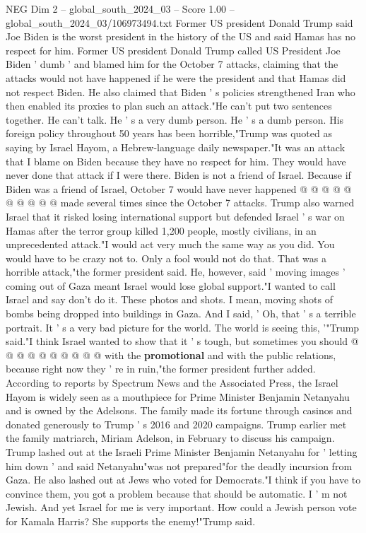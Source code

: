 \begin{textsample}{NEG Dim 2 – global\_south\_2024\_03 – Score 1.00 – global\_south\_2024\_03/106973494.txt}  \label{ex:f2_neg_433}
Former US president Donald Trump said Joe Biden is the worst president in the history of the US and said Hamas has no respect for him.
Former US president Donald Trump called US President Joe Biden ' dumb ' and blamed him for the October 7 attacks, claiming that the attacks would not have happened if he were the president and that Hamas did not respect Biden.
He also claimed that Biden ' s policies strengthened Iran who then enabled its proxies to plan such an attack."He can't put two sentences together.
He can't talk.
He ' s a very dumb person.
He ' s a dumb person.
His foreign policy throughout 50 years has been horrible,"Trump was quoted as saying by Israel Hayom, a Hebrew-language daily newspaper."It was an attack that I blame on Biden because they have no respect for him.
They would have never done that attack if I were there.
Biden is not a friend of Israel.
Because if Biden was a friend of Israel, October 7 would have never happened @ @ @ @ @ @ @ @ @ @ made several times since the October 7 attacks.
Trump also warned Israel that it risked losing international support but defended Israel ' s war on Hamas after the terror group killed 1,200 people, mostly civilians, in an unprecedented attack."I would act very much the same way as you did.
You would have to be crazy not to.
Only a fool would not do that.
That was a horrible attack,"the former president said.
He, however, said ' moving images ' coming out of Gaza meant Israel would lose global support."I wanted to call Israel and say don't do it.
These photos and shots.
I mean, moving shots of bombs being dropped into buildings in Gaza.
And I said, ' Oh, that ' s a terrible portrait.
It ' s a very bad picture for the world.
The world is seeing this, '"Trump said."I think Israel wanted to show that it ' s tough, but sometimes you should @ @ @ @ @ @ @ @ @ @ with the \textbf{promotional} and with the public relations, because right now they ' re in ruin,"the former president further added.
According to reports by Spectrum News and the Associated Press, the Israel Hayom is widely seen as a mouthpiece for Prime Minister Benjamin Netanyahu and is owned by the Adelsons.
The family made its fortune through casinos and donated generously to Trump ' s 2016 and 2020 campaigns.
Trump earlier met the family matriarch, Miriam Adelson, in February to discuss his campaign.
Trump lashed out at the Israeli Prime Minister Benjamin Netanyahu for ' letting him down ' and said Netanyahu"was not prepared"for the deadly incursion from Gaza.
He also lashed out at Jews who voted for Democrats."I think if you have to convince them, you got a problem because that should be automatic.
I ' m not Jewish.
And yet Israel for me is very important.
How could a Jewish person vote for Kamala Harris?
She supports the enemy!"Trump said.

\end{textsample}
